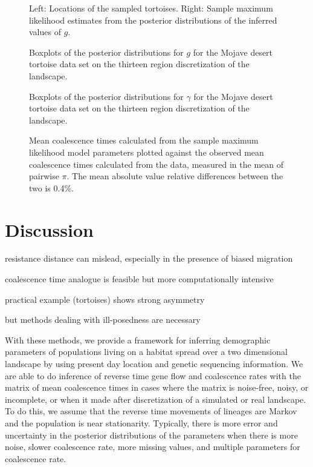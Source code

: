 \documentclass{article}
\begin{document}
\begin{figure}
\centering
\caption{Left: Locations of the sampled tortoises.
Right: Sample maximum likelihood estimates from the posterior distributions of the inferred values of $g$.}
\label{fig:tort_land}
\end{figure}


\begin{figure}
\centering
\caption{Boxplots of the posterior distributions for $g$ 
for the Mojave desert tortoise data set 
on the thirteen region discretization of the landscape.}
\label{fig:tort_post_g}
\end{figure}

\begin{figure}
\centering
\caption{Boxplots of the posterior distributions for $\gamma$ 
for the Mojave desert tortoise data set 
on the thirteen region discretization of the landscape.}
\label{fig:tort_post_gam}
\end{figure}

\begin{figure}
\centering
\caption{Mean coalescence times calculated from the sample maximum likelihood model parameters 
plotted against the observed mean coalescence times calculated from the data, 
measured in the mean of pairwise $\pi$.
The mean absolute value relative differences between the two is 0.4\%.}
\label{fig:tort_h_comp}
\end{figure}


\section*{Discussion}

resistance distance can mislead, especially in the presence of biased migration

coalescence time analogue is feasible but more computationally intensive

practical example (tortoises) shows strong asymmetry

but methods dealing with ill-posedness are necessary


With these methods, we provide a framework for
inferring demographic parameters of 
populations living on a habitat spread over a two dimensional landscape 
by using present day location and genetic sequencing information.
We are able to do inference of reverse time gene flow and coalescence rates 
with the matrix of mean coalescence times
in cases where the matrix is noise-free, noisy, or incomplete, 
or when it made after discretization of a simulated or real landscape.
To do this, we assume that the reverse time movements of lineages are Markov
and the population is near stationarity.
Typically, there is more error and uncertainty in the posterior distributions of the parameters
when there is more noise, slower coalescence rate, more missing values,
and multiple parameters for coalescence rate.
\end{document}
